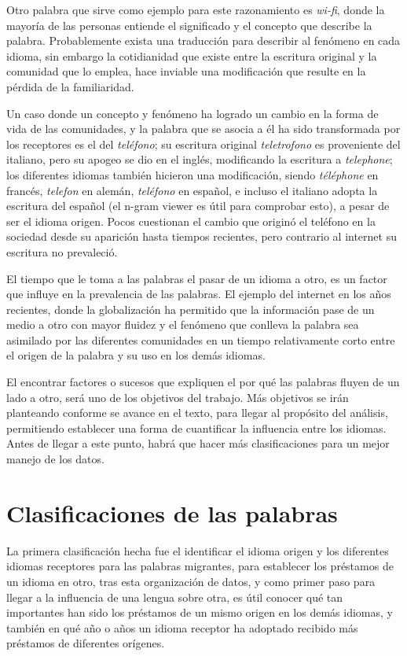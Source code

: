 Otro palabra que sirve como ejemplo para este razonamiento es \textit{wi-fi}, donde la mayoría de las personas entiende el significado y el concepto que describe la palabra. Probablemente  exista una traducción para describir al fenómeno en cada idioma, sin embargo la cotidianidad que existe entre la escritura original y la comunidad que lo emplea, hace inviable una modificación que resulte en la pérdida de la familiaridad.


Un caso donde un concepto y fenómeno ha logrado un cambio en la forma de vida de las comunidades,  y la palabra que se asocia a él ha sido transformada por los receptores es el del \textit{teléfono}; su escritura original \textit{teletrofono} es proveniente del italiano,  pero su apogeo se dio en el inglés, modificando la escritura a \textit{telephone}; los diferentes idiomas también hicieron una modificación, siendo \textit{téléphone} en francés, \textit{telefon} en alemán, \textit{teléfono} en español, e incluso el italiano adopta la escritura del español   (el n-gram viewer es útil para comprobar esto), a pesar de ser el idioma origen. Pocos cuestionan el cambio que originó el teléfono en la sociedad desde su aparición hasta  tiempos recientes, pero contrario al internet su escritura no prevaleció.  

El tiempo que le toma a las palabras el pasar de un idioma a otro, es un factor que influye en la prevalencia de las palabras. El ejemplo del internet en los años recientes,  donde  la globalización ha permitido que la información pase de un medio a otro con mayor fluidez y el fenómeno que conlleva la palabra sea asimilado por las diferentes comunidades en un tiempo relativamente corto entre el origen de la palabra y su uso en los demás idiomas. 

El encontrar factores o sucesos  que expliquen el por qué las palabras fluyen de un lado a otro, será uno de los objetivos del trabajo. Más objetivos se irán planteando conforme se avance en el texto, para llegar al propósito del análisis, permitiendo establecer una forma de cuantificar la influencia entre los idiomas. Antes de llegar a este punto, habrá que hacer más clasificaciones para un mejor manejo de los datos. 

\newpage

\section{Clasificaciones de las palabras}

La primera clasificación  hecha fue el identificar  el  idioma origen y los diferentes idiomas receptores para las palabras migrantes, para establecer los préstamos de un idioma en otro, tras esta organización de datos, y como primer paso para llegar a la influencia de una lengua sobre otra,  es útil conocer qué tan importantes han sido los préstamos de un mismo origen en los demás idiomas, y también en qué año o años un idioma receptor ha adoptado recibido más préstamos de diferentes orígenes. 

